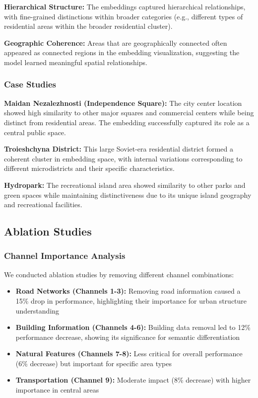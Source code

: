\textbf{Hierarchical Structure:} The embeddings captured hierarchical relationships, with fine-grained distinctions within broader categories (e.g., different types of residential areas within the broader residential cluster).

\textbf{Geographic Coherence:} Areas that are geographically connected often appeared as connected regions in the embedding visualization, suggesting the model learned meaningful spatial relationships.

\subsubsection{Case Studies}

\textbf{Maidan Nezalezhnosti (Independence Square):}
The city center location showed high similarity to other major squares and commercial centers while being distinct from residential areas. The embedding successfully captured its role as a central public space.

\textbf{Troieshchyna District:}
This large Soviet-era residential district formed a coherent cluster in embedding space, with internal variations corresponding to different microdistricts and their specific characteristics.

\textbf{Hydropark:}
The recreational island area showed similarity to other parks and green spaces while maintaining distinctiveness due to its unique island geography and recreational facilities.

\subsection{Ablation Studies}

\subsubsection{Channel Importance Analysis}

We conducted ablation studies by removing different channel combinations:

\begin{itemize}
    \item \textbf{Road Networks (Channels 1-3):} Removing road information caused a 15\% drop in performance, highlighting their importance for urban structure understanding
    \item \textbf{Building Information (Channels 4-6):} Building data removal led to 12\% performance decrease, showing its significance for semantic differentiation
    \item \textbf{Natural Features (Channels 7-8):} Less critical for overall performance (6\% decrease) but important for specific area types
    \item \textbf{Transportation (Channel 9):} Moderate impact (8\% decrease) with higher importance in central areas
\end{itemize}

